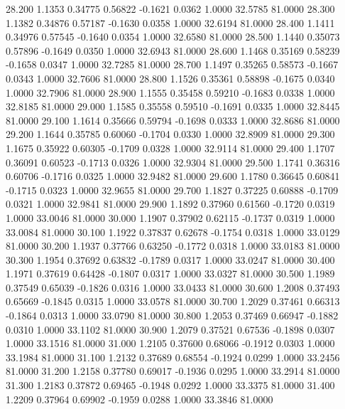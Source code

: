   28.200   1.1353   0.34775   0.56822  -0.1621   0.0362   1.0000  32.5785  81.0000
  28.300   1.1382   0.34876   0.57187  -0.1630   0.0358   1.0000  32.6194  81.0000
  28.400   1.1411   0.34976   0.57545  -0.1640   0.0354   1.0000  32.6580  81.0000
  28.500   1.1440   0.35073   0.57896  -0.1649   0.0350   1.0000  32.6943  81.0000
  28.600   1.1468   0.35169   0.58239  -0.1658   0.0347   1.0000  32.7285  81.0000
  28.700   1.1497   0.35265   0.58573  -0.1667   0.0343   1.0000  32.7606  81.0000
  28.800   1.1526   0.35361   0.58898  -0.1675   0.0340   1.0000  32.7906  81.0000
  28.900   1.1555   0.35458   0.59210  -0.1683   0.0338   1.0000  32.8185  81.0000
  29.000   1.1585   0.35558   0.59510  -0.1691   0.0335   1.0000  32.8445  81.0000
  29.100   1.1614   0.35666   0.59794  -0.1698   0.0333   1.0000  32.8686  81.0000
  29.200   1.1644   0.35785   0.60060  -0.1704   0.0330   1.0000  32.8909  81.0000
  29.300   1.1675   0.35922   0.60305  -0.1709   0.0328   1.0000  32.9114  81.0000
  29.400   1.1707   0.36091   0.60523  -0.1713   0.0326   1.0000  32.9304  81.0000
  29.500   1.1741   0.36316   0.60706  -0.1716   0.0325   1.0000  32.9482  81.0000
  29.600   1.1780   0.36645   0.60841  -0.1715   0.0323   1.0000  32.9655  81.0000
  29.700   1.1827   0.37225   0.60888  -0.1709   0.0321   1.0000  32.9841  81.0000
  29.900   1.1892   0.37960   0.61560  -0.1720   0.0319   1.0000  33.0046  81.0000
  30.000   1.1907   0.37902   0.62115  -0.1737   0.0319   1.0000  33.0084  81.0000
  30.100   1.1922   0.37837   0.62678  -0.1754   0.0318   1.0000  33.0129  81.0000
  30.200   1.1937   0.37766   0.63250  -0.1772   0.0318   1.0000  33.0183  81.0000
  30.300   1.1954   0.37692   0.63832  -0.1789   0.0317   1.0000  33.0247  81.0000
  30.400   1.1971   0.37619   0.64428  -0.1807   0.0317   1.0000  33.0327  81.0000
  30.500   1.1989   0.37549   0.65039  -0.1826   0.0316   1.0000  33.0433  81.0000
  30.600   1.2008   0.37493   0.65669  -0.1845   0.0315   1.0000  33.0578  81.0000
  30.700   1.2029   0.37461   0.66313  -0.1864   0.0313   1.0000  33.0790  81.0000
  30.800   1.2053   0.37469   0.66947  -0.1882   0.0310   1.0000  33.1102  81.0000
  30.900   1.2079   0.37521   0.67536  -0.1898   0.0307   1.0000  33.1516  81.0000
  31.000   1.2105   0.37600   0.68066  -0.1912   0.0303   1.0000  33.1984  81.0000
  31.100   1.2132   0.37689   0.68554  -0.1924   0.0299   1.0000  33.2456  81.0000
  31.200   1.2158   0.37780   0.69017  -0.1936   0.0295   1.0000  33.2914  81.0000
  31.300   1.2183   0.37872   0.69465  -0.1948   0.0292   1.0000  33.3375  81.0000
  31.400   1.2209   0.37964   0.69902  -0.1959   0.0288   1.0000  33.3846  81.0000
